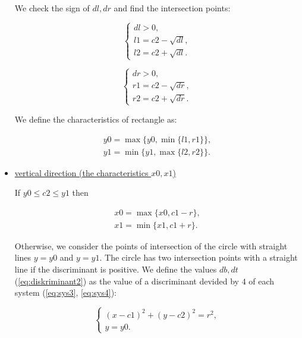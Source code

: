 \documentclass{report}
\begin{document}
\begin{itemize}
	We check the sign of $dl, dr$ and find the intersection points:
	
	\begin{equation}
		\begin{cases}
			dl > 0,\\ 
			l1 = c2 - \sqrt {dl},\\
			l2 = c2 + \sqrt {dl}.
			\label{eq:l1l2}
		\end{cases}
	\end{equation}
	
	\begin{equation}
		\begin{cases}
			dr > 0,\\ 
			r1 = c2 - \sqrt {dr},\\
			r2 = c2 + \sqrt {dr}.
			\label{eq:r1r2}
		\end{cases}
	\end{equation}
	
	We define the characteristics of rectangle as:
	
	\begin{equation}
		\begin{gathered}
			y0 = \max\{y0, \min\{l1, r1\}\},\\
			y1 = \min\{y1, \max\{l2, r2\}\}.
		\end{gathered}
	\end{equation}
	
	\item \underline {vertical direction (the characteristics $x0, x1$) }
	
	If   $y0 \le c2 \le y1$ then
	
	\begin{equation}
		\begin{gathered}
			x0 = \max\{x0, c1-r\},\\
			x1 = \min\{x1, c1+r\}.
		\end{gathered}
	\end{equation}
	
	Otherwise, we consider the points of intersection of the circle with straight lines $y = y0$ and $y = y1$. The circle has two intersection points with a straight line if the discriminant is positive. We define the values $db, dt$ (\ref{eq:diskriminant2}) as the value of a discriminant devided by  $4$ of each system (\ref{eq:sys3}, \ref{eq:sys4}):
	
	\begin{equation}
		\begin{cases}
			(x - c1)^2 + (y - c2)^2 = r^2,\\ 
			y = y0.			
		\end{cases}
		\label{eq:sys3}
	\end{equation}
	

\end{itemize}
\end{document}
